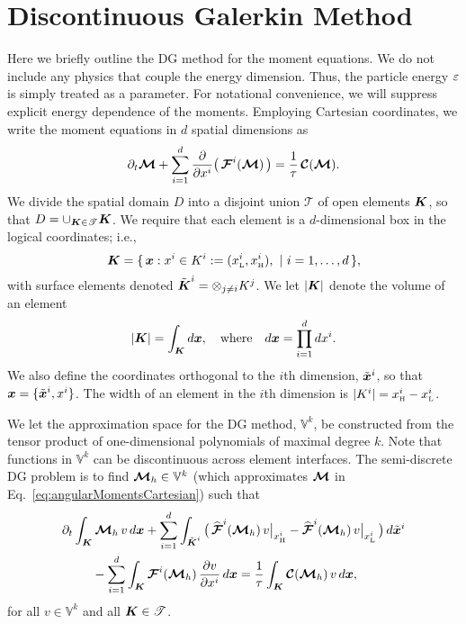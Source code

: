 \section{Discontinuous Galerkin Method}
\label{sec:dg}

Here we briefly outline the DG method for the moment equations.  
We do not include any physics that couple the energy dimension.  
Thus, the particle energy $\varepsilon$ is simply treated as a parameter.  
For notational convenience, we will suppress explicit energy dependence of the moments.  
Employing Cartesian coordinates, we write the moment equations in $d$ spatial dimensions as
\begin{equation}
  \partial_{t}{\boldsymbol{\mathcal{M}}}+\sum_{i=1}^{d}\frac{\partial }{\partial x^{i}}\big(\,\boldsymbol{\mathcal{F}}^{i}(\boldsymbol{\mathcal{M}})\,\big)
  =\frac{1}{\tau}\,\boldsymbol{\mathcal{C}}(\boldsymbol{\mathcal{M}}).  
  \label{eq:angularMomentsCartesian}
\end{equation}
We divide the spatial domain $D$ into a disjoint union $\mathscr{T}$ of open elements $\boldsymbol{K}$, so that $D = \cup_{\boldsymbol{K} \in \mathscr{T}}\boldsymbol{K}$.  
We require that each element is a $d$-dimensional box in the logical coordinates; i.e.,
\begin{equation}
  \boldsymbol{K}=\{\,\boldsymbol{x} : x^{i} \in K^{i} := (x_{\mbox{\tiny L}}^{i},x_{\mbox{\tiny H}}^{i}),~|~i=1,\ldots,d\,\}, 
\end{equation}
with surface elements denoted $\tilde{\boldsymbol{K}}^{i}=\otimes_{j\ne i}K^{j}$.  
We let $|\boldsymbol{K}|$ denote the volume of an element
\begin{equation}
  |\boldsymbol{K}| = \int_{\boldsymbol{K}}d\boldsymbol{x}, \quad\text{where}\quad d\boldsymbol{x} = \prod_{i=1}^{d}dx^{i}.  
\end{equation}
We also define the coordinates orthogonal to the $i$th dimension, $\tilde{\boldsymbol{x}}^{i}$, so that $\boldsymbol{x}=\{\tilde{\boldsymbol{x}}^{i},x^{i}\}$.  
The width of an element in the $i$th dimension is $|K^{i}|=x_{\mbox{\tiny H}}^{i}-x_{\mbox{\tiny L}}^{i}$.  

We let the approximation space for the DG method, $\mathbb{V}^{k}$, be constructed from the tensor product of one-dimensional polynomials of maximal degree $k$.  
Note that functions in $\mathbb{V}^{k}$ can be discontinuous across element interfaces.  
The semi-discrete DG problem is to find $\boldsymbol{\mathcal{M}}_{h}\in\mathbb{V}^{k}$ (which approximates $\boldsymbol{\mathcal{M}}$ in Eq.~\eqref{eq:angularMomentsCartesian}) such that
\begin{align}
  &\partial_{t}{}\int_{\boldsymbol{K}}\boldsymbol{\mathcal{M}}_{h}\,v\,d\boldsymbol{x}
  +\sum_{i=1}^{d}\int_{\tilde{\boldsymbol{K}}^{i}}
  \big(\,
    \widehat{\boldsymbol{\mathcal{F}}}^{i}(\boldsymbol{\mathcal{M}}_{h})\,v\big|_{x_{\mbox{\tiny H}}^{i}}
    -\widehat{\boldsymbol{\mathcal{F}}}^{i}(\boldsymbol{\mathcal{M}}_{h})\,v\big|_{x_{\mbox{\tiny L}}^{i}}
  \,\big)\,d\tilde{\boldsymbol{x}}^{i} \nonumber \\
  &\hspace{24pt}
  -\sum_{i=1}^{d}\int_{\boldsymbol{K}}\boldsymbol{\mathcal{F}}^{i}(\boldsymbol{\mathcal{M}}_{h})\,\frac{\partial v}{\partial x^{i}}\,d\boldsymbol{x}
  =\frac{1}{\tau}\int_{\boldsymbol{K}}\boldsymbol{\mathcal{C}}(\boldsymbol{\mathcal{M}}_{h})\,v\,d\boldsymbol{x},
  \label{eq:semidiscreteDG}
\end{align}
for all $v\in\mathbb{V}^{k}$ and all $\boldsymbol{K}\in\mathscr{T}$.  

